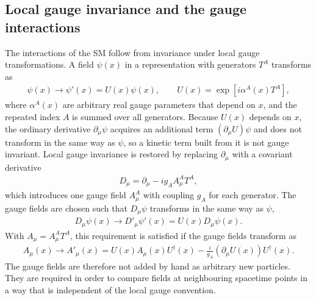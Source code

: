 

\subsection{Local gauge invariance and the gauge interactions}
\label{subsec:local_gauge_invariance}

The interactions of the SM follow from invariance under local gauge transformations.
A field $\psi(x)$ in a representation with generators $T^{A}$ transforms as
\begin{align*}
    \psi(x)
    \rightarrow
    \psi'(x)
    =
    U(x)\psi(x),
    \qquad
    U(x)
    =
    \exp\left[i\alpha^{A}(x)T^{A}\right],
\end{align*}
where $\alpha^{A}(x)$ are arbitrary real gauge parameters that depend on $x$, and the repeated index $A$ is summed over all generators. 
Because $U(x)$ depends on $x$, the ordinary derivative $\partial_{\mu}\psi$ acquires an additional term $(\partial_{\mu}U)\psi$ and does not transform in the same way as $\psi$, so a kinetic term built from it is not gauge invariant. 
Local gauge invariance is restored by replacing $\partial_{\mu}$ with a covariant derivative
\begin{align}
    D_{\mu}
    =
    \partial_{\mu}
    -
    ig_{A}A_{\mu}^{A}T^{A},
    \label{eq:generic_covariant_derivative}
\end{align}
which introduces one gauge field $A_{\mu}^{A}$ with coupling $g_{A}$ for each generator. 
The gauge fields are chosen such that $D_{\mu}\psi$ transforms in the same way as $\psi$,
\begin{align*}
    D_{\mu}\psi(x)
    \rightarrow
    D'_{\mu}\psi'(x)
    =
    U(x)D_{\mu}\psi(x).
\end{align*}
With $A_{\mu}=A_{\mu}^{A}T^{A}$, this requirement is satisfied if the gauge fields transform as
\begin{align*}
    A_{\mu}(x)
    \rightarrow
    A'_{\mu}(x)
    =
    U(x)A_{\mu}(x)U^{\dagger}(x)
    -
    \frac{i}{g_{A}}
    \left(\partial_{\mu}U(x)\right)U^{\dagger}(x).
\end{align*}
The gauge fields are therefore not added by hand as arbitrary new particles. 
They are required in order to compare fields at neighbouring spacetime points in a way that is independent of the local gauge convention.

